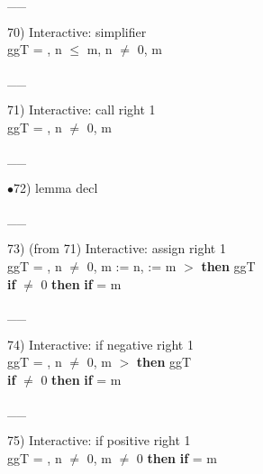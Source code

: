 \documentclass[a4paper]{article}
\begin{document}
\vspace{-1.5ex}\_\hrulefill \_

70) Interactive: simplifier \\
\Do ggT\Dc {} = , n $\le$ m, n $\neq$ 0, m %

\vspace{-1.5ex}\_\hrulefill \_

71) Interactive: call right  1\\
\Do ggT\Dc {} = , n $\neq$ 0, m %

\vspace{-1.5ex}\_\hrulefill \_

$\bullet$72) lemma decl \\
 \Fol 

\vspace{-1.5ex}\_\hrulefill \_

73)  (from 71) Interactive: assign right  1\\
\tabf \Do ggT\Dc {} = , n $\neq$ 0, m %
\Fol \Do {} := n,  := m\Dc
{}  $>$  {\bf then} ggT \\
 \tabf \tabudo{}\tabudc{} {\bf if}  $\neq$ 0 {\bf then} {\bf if}  %
{} = m

\vspace{-1.5ex}\_\hrulefill \_

74) Interactive: if negative right  1\\
\tabf \Do ggT\Dc {} = , n $\neq$ 0, m %
\Fol {}  $>$  {\bf then} ggT \\
 \tabf {} {\bf if}  $\neq$ 0 {\bf then} {\bf if}  %
{} = m

\vspace{-1.5ex}\_\hrulefill \_

75) Interactive: if positive right  1\\
\tabf \Do ggT\Dc {} = , n $\neq$ 0, m %
\Fol {}  $\neq$ 0 {\bf then} {\bf if}  %
{} = m
\end{document}
